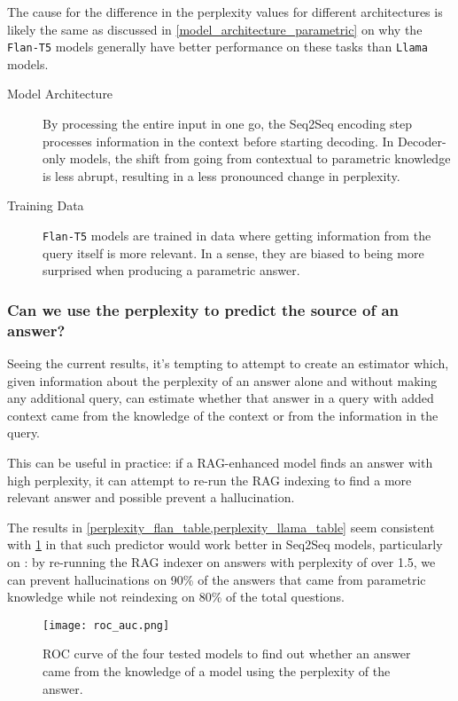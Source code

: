 The cause for the difference in the perplexity values for different architectures is likely the same as discussed in \cref{model_architecture_parametric} on why the \texttt{Flan-T5} models generally have better performance on these tasks than \texttt{Llama} models.
\begin{description}
	\item[Model Architecture] By processing the entire input in one go, the Seq2Seq encoding step processes information in the context before starting decoding. In Decoder-only models, the shift from going from contextual to parametric knowledge is less abrupt, resulting in a less pronounced change in perplexity.
	\item[Training Data] \texttt{Flan-T5} models are trained in data where getting information from the query itself is more relevant.
		In a sense, they are biased to being more surprised when producing a parametric answer.
\end{description}

\subsubsection{Can we use the perplexity to predict the source of an answer?}
\label{perplexity_estimator}

Seeing the current results, it's tempting to attempt to create an estimator which, given information about the perplexity of an answer alone and without making any additional query, can estimate whether that answer in a query with added context came from the \Parametric{} knowledge of the context or from the \Contextual{} information in the query.

This can be useful in practice: if a RAG-enhanced model finds an answer with high perplexity, it can attempt to re-run the RAG indexing to find a more relevant answer and possible prevent a hallucination.

The results in \cref{perplexity_flan_table,perplexity_llama_table} seem consistent with \cref{roc_auc} in that such predictor would work better in Seq2Seq models, particularly on \bigflan{}: by re-running the RAG indexer on answers with perplexity of over 1.5, we can prevent hallucinations on 90\% of the answers that came from parametric knowledge while not reindexing on 80\% of the total questions.

\begin{figure}[hb]
	\centering
	\texttt{[image: roc\_auc.png]}
	\caption{ROC curve of the four tested models to find out whether an answer came from the \Parametric{} knowledge of a model using the perplexity of the answer.}
	\label{roc_auc}
\end{figure}

